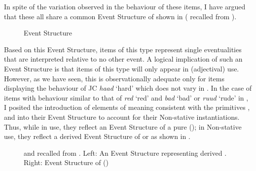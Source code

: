 In spite of the variation observed in the behaviour of these items, I have argued that these all share a common Event Structure of  shown in  ( recalled from ).

\begin{figure}
\caption{\label{ex:6:10} Event Structure \citep[56]{Pustejovsky1991}}
\fbox{\parbox{3cm}{\centering
\begin{forest} [S [e]] \end{forest}}}
\end{figure}

Based on this Event Structure, items of this type represent single eventualities that are interpreted relative to no other event. A logical implication of such an Event Structure is that items of this type will only appear in  (adjectival) use. However, as we have seen, this is observationally adequate only for items displaying the behaviour of JC \textit{haad} `hard' which does not vary in . In the case of items with behaviour similar to that of \textit{red} `red' and \textit{bad} `bad' or \textit{ruud} `rude' in , I posited the introduction of elements of meaning consistent with the primitives \CAUSE, \BECOME and \DO into their Event Structure to account for their Non-stative instantiations. Thus, while in  use, they reflect an Event Structure of a pure  (); in Non-stative use, they reflect a derived Event Structure of  or  as shown in .

\begin{figure}\caption{\label{ex:6:11} and  recalled from . Left: An Event Structure representing derived . Right: Event Structure of  (\citealt[56]{Pustejovsky1991})}
\begin{minipage}{.5\linewidth}\end{minipage}%
\begin{minipage}{.5\linewidth}%
\fbox{\parbox{5cm}{\centering%
\begin{forest}
[P
 [e$_1$,no edge]
 [~~...~~,roof]
 [e$_n$, no edge]
]
\end{forest}
}}\end{minipage}
\end{figure}

